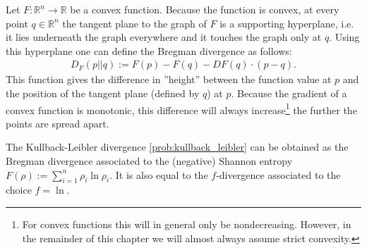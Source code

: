     \begin{definition}\label{info:bregman_divergence}
        Let $F:\mathbb{R}^n\rightarrow\mathbb{R}$ be a convex function. Because the function is convex, at every point $q\in\mathbb{R}^n$ the tangent plane to the graph of $F$ is a supporting hyperplane, i.e. it lies underneath the graph everywhere and it touches the graph only at $q$. Using this hyperplane one can define the Bregman divergence as follows:
        \begin{gather}
            D_F(p||q) := F(p) - F(q) - DF(q)\cdot(p-q).
        \end{gather}
        This function gives the difference in ''height'' between the function value at $p$ and the position of the tangent plane (defined by $q$) at $p$. Because the gradient of a convex function is monotonic, this difference will always increase\footnote{For convex functions this will in general only be nondecreasing. However, in the remainder of this chapter we will almost always assume strict convexity.} the further the points are spread apart.
    \end{definition}
    \begin{example}
        The Kullback-Leibler divergence \ref{prob:kullback_leibler} can be obtained as the Bregman divergence associated to the (negative) Shannon entropy $F(\rho) := \sum_{i=1}^n\rho_i\ln\rho_i$. It is also equal to the $f$-divergence associated to the choice $f=\ln$.
    \end{example}

